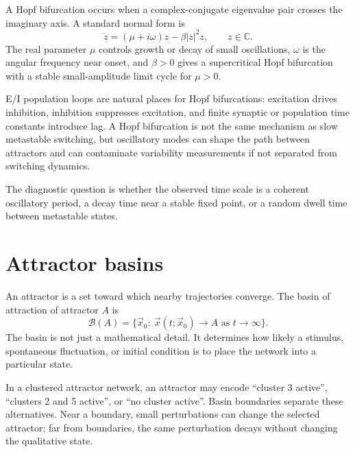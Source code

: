 A Hopf bifurcation occurs when a complex-conjugate eigenvalue pair crosses the imaginary axis. A standard normal form is
%
\begin{equation}
  \dot z = (\mu + i\omega)z - \beta |z|^2z,
  \qquad z\in\mathbb{C}.
  \label{eq:hopf-normal-form}
\end{equation}
%
The real parameter $\mu$ controls growth or decay of small oscillations, $\omega$ is the angular frequency near onset, and $\beta>0$ gives a supercritical Hopf bifurcation with a stable small-amplitude limit cycle for $\mu>0$.

E/I population loops are natural places for Hopf bifurcations: excitation drives inhibition, inhibition suppresses excitation, and finite synaptic or population time constants introduce lag. A Hopf bifurcation is not the same mechanism as slow metastable switching, but oscillatory modes can shape the path between attractors and can contaminate variability measurements if not separated from switching dynamics.

The diagnostic question is whether the observed time scale is a coherent oscillatory period, a decay time near a stable fixed point, or a random dwell time between metastable states.

\section{Attractor basins}
\label{sec:attractor-basins-clustered}

An attractor is a set toward which nearby trajectories converge. The basin of attraction of attractor $A$ is
%
\begin{equation}
  \mathcal{B}(A)=
  \{\vec{x}_0:\ \vec{x}(t;\vec{x}_0)\to A \text{ as } t\to\infty\}.
  \label{eq:basin-definition}
\end{equation}
%
The basin is not just a mathematical detail. It determines how likely a stimulus, spontaneous fluctuation, or initial condition is to place the network into a particular state.

In a clustered attractor network, an attractor may encode ``cluster 3 active'', ``clusters 2 and 5 active'', or ``no cluster active''. Basin boundaries separate these alternatives. Near a boundary, small perturbations can change the selected attractor; far from boundaries, the same perturbation decays without changing the qualitative state.


